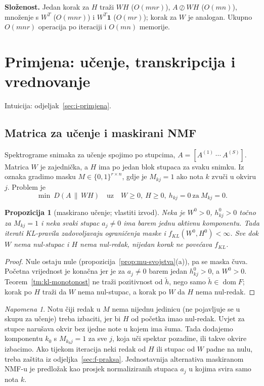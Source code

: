 \documentclass[11pt,a4paper]{article}
\theoremstyle{definition}
\theoremstyle{plain}
\newtheorem{propozicija}[definicija]{Propozicija}
\theoremstyle{remark}
\newtheorem{napomena}[definicija]{Napomena}
\newcommand{\one}{\mathbf{1}}
\newcommand{\Dkl}[2]{D(#1\,\|\,#2)}
\DeclareMathOperator{\dom}{dom}
\newcommand{\intuicija}[1]{{\small\color{muted}\sffamily Intuicija: odjeljak~\ref{#1}.}\par}
\begin{document}
\textbf{Složenost.} Jedan korak za $H$ traži $WH$ ($O(mnr)$), $A\oslash WH$ ($O(mn)$), množenje s
$W^T$ ($O(mnr)$) i $W^T\one$ ($O(mr)$); korak za $W$ je analogan. Ukupno $O(mnr)$ operacija po
iteraciji i $O(mn)$ memorije.

\section{Primjena: učenje, transkripcija i vrednovanje}\label{sec:f-primjena}
\intuicija{sec:i-primjena}

\subsection{Matrica za učenje i maskirani NMF}

Spektrograme snimaka za učenje spojimo po stupcima, $A=[A^{(1)}\ \cdots\ A^{(S)}]$. Matrica $W$ je
zajednička, a $H$ ima po jedan blok stupaca za svaku snimku. Iz oznaka gradimo masku
$M\in\{0,1\}^{r\times n}$, gdje je $M_{kj}=1$ ako nota $k$ zvuči u okviru $j$. Problem je
\[
  \min\ \Dkl{A}{WH}\quad\text{uz}\quad W\geq0,\ H\geq0,\ h_{kj}=0\ \text{za}\ M_{kj}=0.
\]

\begin{propozicija}[maskirano učenje; vlastiti izvod]\label{prop:maska}
Neka je $W^0>0$, $h^0_{kj}>0$ točno za $M_{kj}=1$ i neka svaki stupac $a_j\neq0$ ima barem jednu
aktivnu komponentu. Tada iterati KL-pravila zadovoljavaju ograničenja maske i
$f_{KL}(W^0,H^0)<\infty$. Sve dok $W$ nema nul-stupac i $H$ nema nul-redak, nijedan korak ne
povećava $f_{KL}$.
\end{propozicija}
\begin{proof}
Nule ostaju nule (propozicija~\ref{prop:mu-svojstva}(a)), pa se maska čuva. Početna vrijednost je
konačna jer je za $a_j\neq0$ barem jedan $h^0_{kj}>0$, a $W^0>0$. Teorem~\ref{tm:kl-monotonost} ne
traži pozitivnost od $\tilde h$, nego samo $\tilde h\in\dom F$; korak po $H$ traži da $W$ nema
nul-stupac, a korak po $W$ da $H$ nema nul-redak.
\end{proof}

\begin{napomena}
Notu čiji redak u $M$ nema nijednu jedinicu (ne pojavljuje se u skupu za učenje) treba izbaciti, jer
bi $H$ od početka imao nul-redak. Uvjet za stupce narušava okvir bez ijedne note u kojem ima šuma.
Tada dodajemo komponentu $k_0$ s $M_{k_0j}=1$ za sve $j$, koja uči spektar pozadine, ili takve okvire
izbacimo. Ako tijekom iteracija neki redak od $H$ ili stupac od $W$ padne na nulu, treba zaštita iz
odjeljka~\ref{sec:f-praksa}. Jednostavnija alternativa maskiranom NMF-u je predložak kao prosjek
normaliziranih stupaca $a_j$ u kojima svira samo nota $k$.
\end{napomena}
\end{document}
